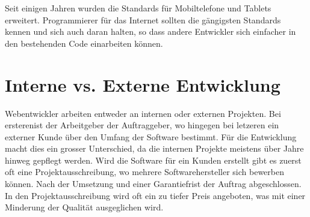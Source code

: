 Seit einigen Jahren wurden die Standards für Mobiltelefone und Tablets erweitert. Programmierer für das Internet sollten die gängigsten Standards kennen und sich auch daran halten, so dass andere Entwickler sich einfacher in den bestehenden Code einarbeiten können.

\section{Interne vs. Externe Entwicklung}
Webentwickler arbeiten entweder an internen oder externen Projekten. Bei ersterenist der Arbeitgeber der Auftraggeber, wo hingegen bei letzeren ein externer Kunde über den Umfang der Software bestimmt. Für die Entwicklung macht dies ein grosser Unterschied, da die internen Projekte meistens über Jahre hinweg gepflegt werden. Wird die Software für ein Kunden erstellt gibt es zuerst oft eine Projektausschreibung, wo mehrere Softwarehersteller sich bewerben können. Nach der Umsetzung und einer Garantiefrist der Auftrag abgeschlossen. In den Projektausschreibung wird oft ein zu tiefer Preis angeboten, was mit einer Minderung der Qualität ausgeglichen wird.
